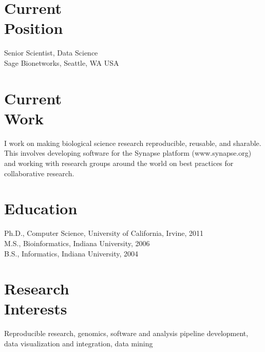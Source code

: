 \documentclass[margin,line]{res}
\begin{document}
\address{\textbf{E-mail:} kenny@kennydaily.net \textbf{Web:} www.kennydaily.net}
\address{810 Taylor Ave N Apt 328, Seattle, WA 98109}

\begin{resume}


\section{\sc Current\\Position}
Senior Scientist, Data Science\\
Sage Bionetworks, Seattle, WA USA

\section{\sc Current\\Work}
I work on making biological science research reproducible, reusable, and sharable. This involves developing software for the Synapse platform (www.synapse.org) and working with research groups around the
world on best practices for collaborative research.

\section{\sc Education}
Ph.D., Computer Science, University of California, Irvine, 2011\\%
M.S., Bioinformatics, Indiana University, 2006\\%
B.S., Informatics, Indiana University, 2004%

\section{\sc Research\\Interests}
Reproducible research, genomics, software and analysis pipeline development, data visualization and integration, data mining


\end{resume}
\end{document}
